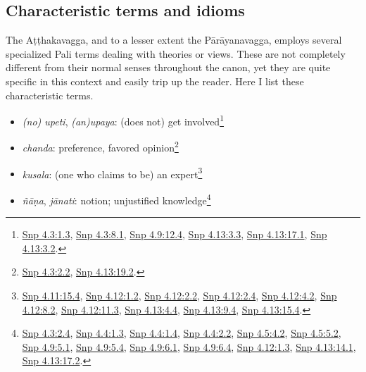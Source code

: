 \documentclass[12pt,openany]{book}%
\begin{document}
\subsection*{Characteristic terms and idioms}

The \textsanskrit{Aṭṭhakavagga}, and to a lesser extent the \textsanskrit{Pārāyanavagga}, employs several specialized Pali terms dealing with theories or views. These are not completely different from their normal senses throughout the canon, yet they are quite specific in this context and easily trip up the reader. Here I list these characteristic terms.

\begin{itemize}%
\item \textit{(no) upeti}, \textit{(an)upaya}: (does not) get involved\footnote{\href{https://suttacentral.net/snp4.3/en/sujato\#1.3}{Snp 4.3:1.3}, \href{https://suttacentral.net/snp4.3/en/sujato\#8.1}{Snp 4.3:8.1}, \href{https://suttacentral.net/snp4.9/en/sujato\#12.4}{Snp 4.9:12.4}, \href{https://suttacentral.net/snp4.13/en/sujato\#3.3}{Snp 4.13:3.3}, \href{https://suttacentral.net/snp4.13/en/sujato\#17.1}{Snp 4.13:17.1}, \href{https://suttacentral.net/snp4.13/en/sujato\#3.2}{Snp 4.13:3.2}. }%
\item \textit{chanda}: preference, favored opinion\footnote{\href{https://suttacentral.net/snp4.3/en/sujato\#2.2}{Snp 4.3:2.2}, \href{https://suttacentral.net/snp4.13/en/sujato\#19.2}{Snp 4.13:19.2}. }%
\item \textit{kusala}: (one who claims to be) an expert\footnote{\href{https://suttacentral.net/snp4.11/en/sujato\#15.4}{Snp 4.11:15.4}, \href{https://suttacentral.net/snp4.12/en/sujato\#1.2}{Snp 4.12:1.2}, \href{https://suttacentral.net/snp4.12/en/sujato\#2.2}{Snp 4.12:2.2}, \href{https://suttacentral.net/snp4.12/en/sujato\#2.4}{Snp 4.12:2.4}, \href{https://suttacentral.net/snp4.12/en/sujato\#4.2}{Snp 4.12:4.2}, \href{https://suttacentral.net/snp4.12/en/sujato\#8.2}{Snp 4.12:8.2}, \href{https://suttacentral.net/snp4.12/en/sujato\#11.3}{Snp 4.12:11.3}, \href{https://suttacentral.net/snp4.13/en/sujato\#4.4}{Snp 4.13:4.4}, \href{https://suttacentral.net/snp4.13/en/sujato\#9.4}{Snp 4.13:9.4}, \href{https://suttacentral.net/snp4.13/en/sujato\#15.4}{Snp 4.13:15.4}. }%
\item \textit{\textsanskrit{ñāṇa}}, \textit{\textsanskrit{jānati}}: notion; unjustified knowledge\footnote{\href{https://suttacentral.net/snp4.3/en/sujato\#2.4}{Snp 4.3:2.4}, \href{https://suttacentral.net/snp4.4/en/sujato\#1.3}{Snp 4.4:1.3}, \href{https://suttacentral.net/snp4.4/en/sujato\#1.4}{Snp 4.4:1.4}, \href{https://suttacentral.net/snp4.4/en/sujato\#2.2}{Snp 4.4:2.2}, \href{https://suttacentral.net/snp4.5/en/sujato\#4.2}{Snp 4.5:4.2}, \href{https://suttacentral.net/snp4.5/en/sujato\#5.2}{Snp 4.5:5.2}, \href{https://suttacentral.net/snp4.9/en/sujato\#5.1}{Snp 4.9:5.1}, \href{https://suttacentral.net/snp4.9/en/sujato\#5.4}{Snp 4.9:5.4}, \href{https://suttacentral.net/snp4.9/en/sujato\#6.1}{Snp 4.9:6.1}, \href{https://suttacentral.net/snp4.9/en/sujato\#6.4}{Snp 4.9:6.4}, \href{https://suttacentral.net/snp4.12/en/sujato\#1.3}{Snp 4.12:1.3}, \href{https://suttacentral.net/snp4.13/en/sujato\#14.1}{Snp 4.13:14.1}, \href{https://suttacentral.net/snp4.13/en/sujato\#17.2}{Snp 4.13:17.2}. }%

\end{itemize}
\end{document}
